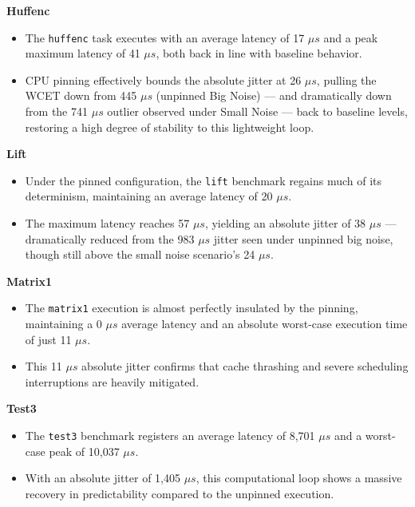 \textbf{Huffenc}

\begin{itemize}
\item
  The \texttt{huffenc} task executes with an average latency of 17 $\mu s$
  and a peak maximum latency of 41 $\mu s$, both back in line with baseline
  behavior.
\item
  CPU pinning effectively bounds the absolute jitter at 26 $\mu s$, pulling
  the WCET down from 445 $\mu s$ (unpinned Big Noise) --- and dramatically
  down from the 741 $\mu s$ outlier observed under Small Noise --- back to
  baseline levels, restoring a high degree of stability to this
  lightweight loop.
\end{itemize}

\textbf{Lift}

\begin{itemize}
\item
  Under the pinned configuration, the \texttt{lift} benchmark regains
  much of its determinism, maintaining an average latency of 20 $\mu s$.
\item
  The maximum latency reaches 57 $\mu s$, yielding an absolute jitter of 38
  $\mu s$ --- dramatically reduced from the 983 $\mu s$ jitter seen under unpinned
  big noise, though still above the small noise scenario's 24 $\mu s$.
\end{itemize}

\textbf{Matrix1}

\begin{itemize}
\item
  The \texttt{matrix1} execution is almost perfectly insulated by the
  pinning, maintaining a 0 $\mu s$ average latency and an absolute worst-case
  execution time of just 11 $\mu s$.
\item
  This 11 $\mu s$ absolute jitter confirms that cache thrashing and severe
  scheduling interruptions are heavily mitigated.
\end{itemize}

\textbf{Test3}

\begin{itemize}
\item
  The \texttt{test3} benchmark registers an average latency of 8,701 $\mu s$
  and a worst-case peak of 10,037 $\mu s$.
\item
  With an absolute jitter of 1,405 $\mu s$, this computational loop shows a
  massive recovery in predictability compared to the unpinned execution.
\end{itemize}

